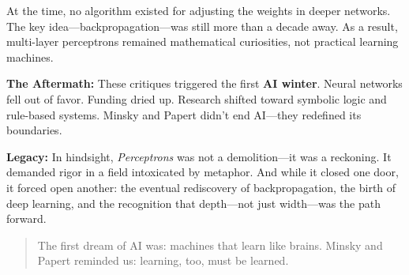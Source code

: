 At the time, no algorithm existed for adjusting the weights in deeper networks. The key idea—backpropagation—was still more than a decade away. As a result, multi-layer perceptrons remained mathematical curiosities, not practical learning machines.

\medskip

\noindent\textbf{The Aftermath:} These critiques triggered the first \textbf{AI winter}. Neural networks fell out of favor. Funding dried up. Research shifted toward symbolic logic and rule-based systems. Minsky and Papert didn’t end AI—they redefined its boundaries.

\medskip

\noindent\textbf{Legacy:} In hindsight, \emph{Perceptrons} was not a demolition—it was a reckoning. It demanded rigor in a field intoxicated by metaphor. And while it closed one door, it forced open another: the eventual rediscovery of backpropagation, the birth of deep learning, and the recognition that depth—not just width—was the path forward.

\begin{quote}
The first dream of AI was: machines that learn like brains.  
Minsky and Papert reminded us: learning, too, must be learned.
\end{quote}

